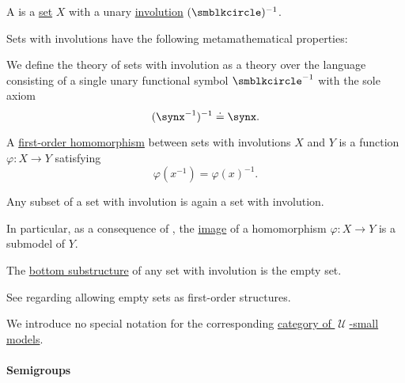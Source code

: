 \begin{definition}\label{def:set_with_involution}\mimprovised
  A  is a \hyperref[def:set]{set} \( X \) with a unary \hyperref[def:morphism_invertibility/involution]{involution} \( (\anon)^{-1} \).

  Sets with involutions have the following metamathematical properties:
  \begin{thmenum}
     We define the theory of sets with involution as a theory over the language consisting of a single unary functional symbol \( \anon^{-1} \) with the sole axiom
    \begin{equation}\label{eq:def:set_with_involution/theory/axiom}
      (\synx^{-1})^{-1} \syneq \synx.
    \end{equation}

     A \hyperref[def:first_order_homomorphism]{first-order homomorphism} between sets with involutions \( X \) and \( Y \) is a function \( \varphi: X \to Y \) satisfying
    \begin{equation}\label{eq:def:set_with_involution/homomorphism}
      \varphi(x^{-1})
      =
      \varphi(x)^{-1}.
    \end{equation}

     Any subset of a set with involution is again a set with involution.

    In particular, as a consequence of , the \hyperref[def:set_valued_map/image]{image} of a homomorphism \( \varphi: X \to Y \) is a submodel of \( Y \).

    The \hyperref[thm:substructures_form_complete_lattice/bottom]{bottom substructure} of any set with involution is the empty set.

    See  regarding allowing empty sets as first-order structures.

     We introduce no special notation for the corresponding \hyperref[def:category_of_small_first_order_models]{category of \( \mscrU \)-small models}.
  \end{thmenum}
\end{definition}

\paragraph{Semigroups}

